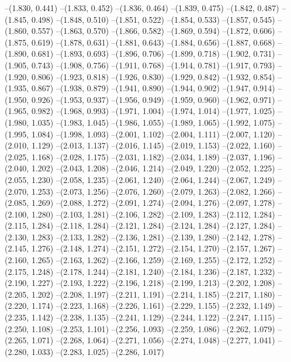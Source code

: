 {--(1.830, 0.441)
--(1.833, 0.452)
--(1.836, 0.464)
--(1.839, 0.475)
--(1.842, 0.487)
--(1.845, 0.498)
--(1.848, 0.510)
--(1.851, 0.522)
--(1.854, 0.533)
--(1.857, 0.545)
--(1.860, 0.557)
--(1.863, 0.570)
--(1.866, 0.582)
--(1.869, 0.594)
--(1.872, 0.606)
--(1.875, 0.619)
--(1.878, 0.631)
--(1.881, 0.643)
--(1.884, 0.656)
--(1.887, 0.668)
--(1.890, 0.681)
--(1.893, 0.693)
--(1.896, 0.706)
--(1.899, 0.718)
--(1.902, 0.731)
--(1.905, 0.743)
--(1.908, 0.756)
--(1.911, 0.768)
--(1.914, 0.781)
--(1.917, 0.793)
--(1.920, 0.806)
--(1.923, 0.818)
--(1.926, 0.830)
--(1.929, 0.842)
--(1.932, 0.854)
--(1.935, 0.867)
--(1.938, 0.879)
--(1.941, 0.890)
--(1.944, 0.902)
--(1.947, 0.914)
--(1.950, 0.926)
--(1.953, 0.937)
--(1.956, 0.949)
--(1.959, 0.960)
--(1.962, 0.971)
--(1.965, 0.982)
--(1.968, 0.993)
--(1.971, 1.004)
--(1.974, 1.014)
--(1.977, 1.025)
--(1.980, 1.035)
--(1.983, 1.045)
--(1.986, 1.055)
--(1.989, 1.065)
--(1.992, 1.075)
--(1.995, 1.084)
--(1.998, 1.093)
--(2.001, 1.102)
--(2.004, 1.111)
--(2.007, 1.120)
--(2.010, 1.129)
--(2.013, 1.137)
--(2.016, 1.145)
--(2.019, 1.153)
--(2.022, 1.160)
--(2.025, 1.168)
--(2.028, 1.175)
--(2.031, 1.182)
--(2.034, 1.189)
--(2.037, 1.196)
--(2.040, 1.202)
--(2.043, 1.208)
--(2.046, 1.214)
--(2.049, 1.220)
--(2.052, 1.225)
--(2.055, 1.230)
--(2.058, 1.235)
--(2.061, 1.240)
--(2.064, 1.244)
--(2.067, 1.249)
--(2.070, 1.253)
--(2.073, 1.256)
--(2.076, 1.260)
--(2.079, 1.263)
--(2.082, 1.266)
--(2.085, 1.269)
--(2.088, 1.272)
--(2.091, 1.274)
--(2.094, 1.276)
--(2.097, 1.278)
--(2.100, 1.280)
--(2.103, 1.281)
--(2.106, 1.282)
--(2.109, 1.283)
--(2.112, 1.284)
--(2.115, 1.284)
--(2.118, 1.284)
--(2.121, 1.284)
--(2.124, 1.284)
--(2.127, 1.284)
--(2.130, 1.283)
--(2.133, 1.282)
--(2.136, 1.281)
--(2.139, 1.280)
--(2.142, 1.278)
--(2.145, 1.276)
--(2.148, 1.274)
--(2.151, 1.272)
--(2.154, 1.270)
--(2.157, 1.267)
--(2.160, 1.265)
--(2.163, 1.262)
--(2.166, 1.259)
--(2.169, 1.255)
--(2.172, 1.252)
--(2.175, 1.248)
--(2.178, 1.244)
--(2.181, 1.240)
--(2.184, 1.236)
--(2.187, 1.232)
--(2.190, 1.227)
--(2.193, 1.222)
--(2.196, 1.218)
--(2.199, 1.213)
--(2.202, 1.208)
--(2.205, 1.202)
--(2.208, 1.197)
--(2.211, 1.191)
--(2.214, 1.185)
--(2.217, 1.180)
--(2.220, 1.174)
--(2.223, 1.168)
--(2.226, 1.161)
--(2.229, 1.155)
--(2.232, 1.149)
--(2.235, 1.142)
--(2.238, 1.135)
--(2.241, 1.129)
--(2.244, 1.122)
--(2.247, 1.115)
--(2.250, 1.108)
--(2.253, 1.101)
--(2.256, 1.093)
--(2.259, 1.086)
--(2.262, 1.079)
--(2.265, 1.071)
--(2.268, 1.064)
--(2.271, 1.056)
--(2.274, 1.048)
--(2.277, 1.041)
--(2.280, 1.033)
--(2.283, 1.025)
--(2.286, 1.017)
}
